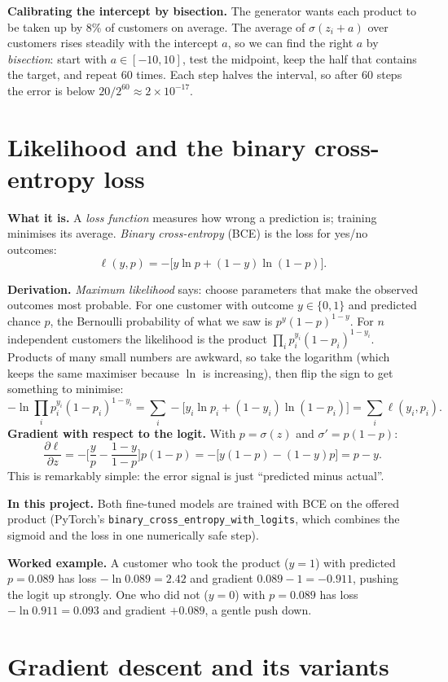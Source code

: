\documentclass[10pt,a4paper]{article}
\newcommand{\what}[1]{\par\textbf{What it is.} #1}
\newcommand{\here}[1]{\par\textbf{In this project.} #1}
\newcommand{\deriv}{\par\textbf{Derivation.} }
\newcommand{\ex}{\par\textbf{Worked example.} }
\begin{document}
\textbf{Calibrating the intercept by bisection.} The generator wants each product to be taken up by 8\% of customers on average. The average of $\sigma(z_i+a)$ over customers rises steadily with the intercept $a$, so we can find the right $a$ by \emph{bisection}: start with $a\in[-10,10]$, test the midpoint, keep the half that contains the target, and repeat 60 times. Each step halves the interval, so after 60 steps the error is below $20/2^{60}\approx2\times10^{-17}$.

\section{Likelihood and the binary cross-entropy loss}\label{sec:bce}
\what{A \emph{loss function} measures how wrong a prediction is; training minimises its average. \emph{Binary cross-entropy} (BCE) is the loss for yes/no outcomes:
\[\ell(y,p)=-\big[y\ln p+(1-y)\ln(1-p)\big].\]}
\deriv \emph{Maximum likelihood} says: choose parameters that make the observed outcomes most probable. For one customer with outcome $y\in\{0,1\}$ and predicted chance $p$, the Bernoulli probability of what we saw is $p^y(1-p)^{1-y}$. For $n$ independent customers the likelihood is the product $\prod_i p_i^{y_i}(1-p_i)^{1-y_i}$. Products of many small numbers are awkward, so take the logarithm (which keeps the same maximiser because $\ln$ is increasing), then flip the sign to get something to minimise:
\[-\ln\prod_i p_i^{y_i}(1-p_i)^{1-y_i}=\sum_i-\big[y_i\ln p_i+(1-y_i)\ln(1-p_i)\big]=\sum_i\ell(y_i,p_i).\]
\textbf{Gradient with respect to the logit.} With $p=\sigma(z)$ and $\sigma'=p(1-p)$:
\[\frac{\partial\ell}{\partial z}=-\Big[\frac{y}{p}-\frac{1-y}{1-p}\Big]p(1-p)=-\big[y(1-p)-(1-y)p\big]=p-y.\]
This is remarkably simple: the error signal is just ``predicted minus actual''.
\here{Both fine-tuned models are trained with BCE on the offered product (PyTorch's \texttt{binary\_cross\_\allowbreak entropy\_\allowbreak with\_\allowbreak logits}, \allowbreak which combines the sigmoid and the loss in one numerically safe step).}
\ex A customer who took the product ($y=1$) with predicted $p=0.089$ has loss $-\ln0.089=2.42$ and gradient $0.089-1=-0.911$, pushing the logit up strongly. One who did not ($y=0$) with $p=0.089$ has loss $-\ln0.911=0.093$ and gradient $+0.089$, a gentle push down.

\section{Gradient descent and its variants}
\end{document}

